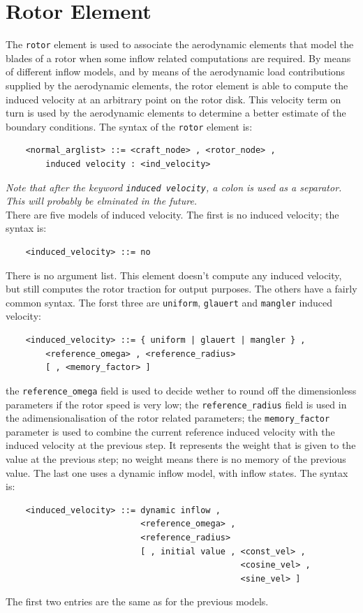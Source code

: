 \section{Rotor Element}
The \texttt{rotor} element is used to associate the aerodynamic elements that
model the blades of a rotor when some inflow related computations are
required. By means of different inflow models, and by means of the
aerodynamic load contributions supplied by the aerodynamic elements, the
rotor element is able to compute the induced velocity at an arbitrary point on
the rotor disk. This velocity term on turn is used by the aerodynamic
elements to determine a better estimate of the boundary conditions.
The syntax of the \texttt{rotor} element is:
\begin{verbatim}
    <normal_arglist> ::= <craft_node> , <rotor_node> ,
        induced velocity : <ind_velocity>
\end{verbatim}
{\em 
    Note that after the keyword \texttt{induced velocity}, a colon is used as a
    separator. This will probably be elminated in the future.
} \\
There are five models of induced velocity. 
The first is no induced velocity; the syntax is:
\begin{verbatim}
    <induced_velocity> ::= no
\end{verbatim}
There is no argument list. This element doesn't compute any induced
velocity, but still computes the rotor traction for output purposes.
The others have a fairly common syntax. The forst three are
\texttt{uniform}, \texttt{glauert} and \texttt{mangler} induced velocity:
\begin{verbatim}
    <induced_velocity> ::= { uniform | glauert | mangler } , 
        <reference_omega> , <reference_radius> 
        [ , <memory_factor> ]
\end{verbatim}
the \texttt{reference\_omega} field is used to decide wether to round off the
dimensionless parameters if the rotor speed is very low; the
\texttt{reference\_radius} field is used in the adimensionalisation of the
rotor related parameters; the \texttt{memory\_factor} parameter is used to
combine the current reference induced velocity with the induced velocity
at the previous step. It represents the weight that is given to the value at
the previous step; no weight means there is no memory of the previous value.
The last one uses a dynamic inflow model, with inflow states.
The syntax is:
\begin{verbatim}
    <induced_velocity> ::= dynamic inflow , 
                           <reference_omega> , 
                           <reference_radius> 
                           [ , initial value , <const_vel> ,
                                               <cosine_vel> ,
                                               <sine_vel> ]
\end{verbatim}
The first two entries are the same as for the previous models. 




